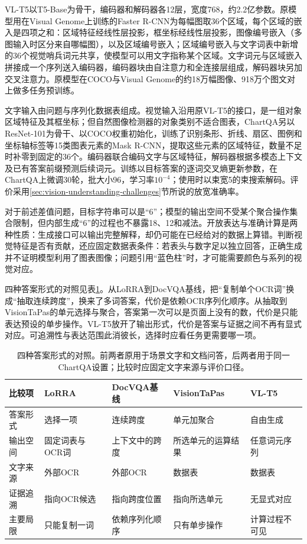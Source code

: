 VL-T5以T5-Base为骨干，编码器和解码器各12层，宽度768，约2.2亿参数。原模型用在Visual Genome上训练的Faster R-CNN为每幅图取36个区域，每个区域的嵌入是四项之和：区域特征经线性层投影，框坐标经线性层投影，图像编号嵌入（多图输入时区分来自哪幅图），以及区域编号嵌入；区域编号嵌入与文字词表中新增的36个视觉哨兵词元共享，使模型可以用文字指称某个区域。文字词元与区域嵌入拼接成一个序列送入编码器，编码器块由自注意力和全连接层组成，解码器块另加交叉注意力。原模型在COCO与Visual Genome的约18万幅图像、918万个图文对上做多任务预训练。

文字输入由问题与序列化数据表组成。视觉输入沿用原VL-T5的接口，是一组对象区域特征及其框坐标；但自然图像检测器的对象类别不适合图表，ChartQA另以ResNet-101为骨干、以COCO权重初始化，训练了识别条形、折线、扇区、图例和坐标轴标签等15类图表元素的Mask R-CNN，提取这些元素的区域特征，数量不足时补零到固定的36个。编码器联合编码文字与区域特征，解码器根据多模态上下文及已有答案前缀预测后续词元。训练以目标答案的逐词交叉熵更新参数，在ChartQA上微调30轮，批大小96，学习率$10^{-4}$；使用时以束宽5的束搜索解码。评价采用\ref{sec:vision-understanding-challenges}节所说的放宽准确率。

对于前述差值问题，目标字符串可以是“6”；模型的输出空间不受某个聚合操作集合限制，但内部生成“6”的过程也不暴露18、12和减法。开放表达与准确计算是两种性质：生成接口可以输出完整解释，却仍可能在已经给对的数据上算错。判断视觉特征是否有贡献，还应固定数据表条件：若表头与数字足以独立回答，正确生成并不证明模型利用了图表图像；问题引用“蓝色柱”时，才可能需要颜色与系列的视觉对应。

四种答案形式的对照见表\ref{tab:vision-understanding-answer-compare}。从LoRRA到DocVQA基线，把“复制单个OCR词”换成“抽取连续跨度”，换来了多词答案，代价是依赖OCR序列化顺序。从抽取到VisionTaPas的单元选择与聚合，答案第一次可以是页面上没有的数，代价是只能表达预设的单步操作。VL-T5放开了输出形式，代价是答案与证据之间不再有显式对应。可追溯性与表达范围此消彼长，选择时应看任务更需要哪一项。

\begin{table}[htbp]
  \centering
  \small
  \begin{tabularx}{\linewidth}{@{}p{12mm}XXXX@{}}
    \toprule
    比较项 & LoRRA & DocVQA基线 & VisionTaPas & VL-T5\\
    \midrule
    答案形式 & 选择一项 & 连续跨度 & 单元加聚合 & 自由生成\\
    输出空间 & 固定词表与OCR词 & 上下文中的跨度 & 所选单元的运算结果 & 任意词元序列\\
    文字来源 & 外部OCR & 外部OCR & 数据表 & 数据表\\
    证据追溯 & 指向OCR候选 & 指向跨度位置 & 指向所选单元 & 无显式对应\\
    主要局限 & 只能复制一词 & 依赖序列化顺序 & 只有单步操作 & 计算过程不可见\\
    \bottomrule
  \end{tabularx}
  \caption{四种答案形式的对照。前两者原用于场景文字和文档问答，后两者用于同一ChartQA设置；比较时应固定文字来源与评价口径。}
  \label{tab:vision-understanding-answer-compare}
\end{table}

